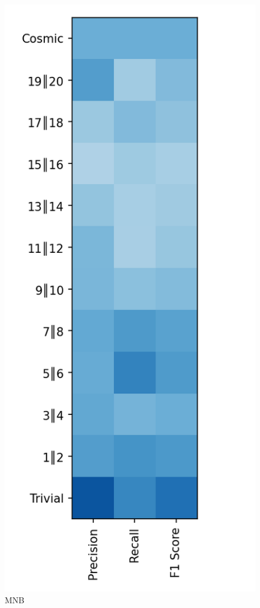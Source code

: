 \documentclass{article}
\begin{document}
\begin{figure}[ht]
\begin{minipage}[b]{0.32\linewidth}
			\caption*{MNB} 
			\vspace{10ex}
		\end{minipage}
		\begin{minipage}[b]{0.32\linewidth}
			\centering
			\includegraphics[width=\linewidth]{12 - Random Forest.png} 

\end{minipage}
\end{figure}
\end{document}
